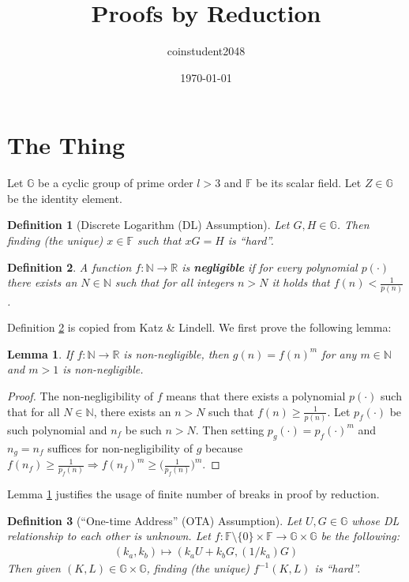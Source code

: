 \documentclass{article}
\title{Proofs by Reduction}
\author{coinstudent2048}
\date{\today}
\newtheorem{definition}{Definition}[section]
\newtheorem{lemma}[theorem]{Lemma}
\begin{document}
\maketitle


\section{The Thing}
\noindent Let $\mathbb{G}$ be a cyclic group of prime order $l>3$ and $\mathbb{F}$ be its scalar field. Let $Z\in\mathbb{G}$ be the identity element.

\begin{definition}[Discrete Logarithm (DL) Assumption]
Let $G, H\in\mathbb{G}$. Then finding (the unique) $x\in\mathbb{F}$ such that $xG=H$ is ``hard''.
\end{definition}

\begin{definition}\label{negl}
A function $f:\mathbb{N}\rightarrow\mathbb{R}$ is \textbf{\em negligible} if for every polynomial $p(\cdot)$ there exists an $N\in\mathbb{N}$ such that for all integers $n>N$ it holds that $f(n)<\frac{1}{p(n)}$.
\end{definition}

\noindent Definition \ref{negl} is copied from Katz \& Lindell. We first prove the following lemma:

\begin{lemma}\label{negl-exp}
If $f:\mathbb{N}\rightarrow\mathbb{R}$ is non-negligible, then $g(n)=f(n)^m$ for any $m\in\mathbb{N}$ and $m>1$ is non-negligible.
\end{lemma}
\begin{proof}
The non-negligibility of $f$ means that there exists a polynomial $p(\cdot)$ such that for all $N\in\mathbb{N}$, there exists an $n>N$ such that $f(n)\ge\frac{1}{p(n)}$. Let $p_f(\cdot)$ be such polynomial and $n_f$ be such $n>N$. Then setting $p_g(\cdot)=p_f(\cdot)^m$ and $n_g=n_f$ suffices for non-negligibility of $g$ because $f(n_f)\ge\frac{1}{p_f(n)}\Rightarrow f(n_f)^m\ge\big(\frac{1}{p_f(n)}\big)^m$.
\end{proof}

\noindent Lemma \ref{negl-exp} justifies the usage of finite number of breaks in proof by reduction.

\begin{definition}[``One-time Address'' (OTA) Assumption]
Let $U, G\in\mathbb{G}$ whose DL relationship to each other is unknown. Let $f:\mathbb{F}\setminus\{0\}\times\mathbb{F}\rightarrow\mathbb{G}\times\mathbb{G}$ be the following:
\begin{align*}
    (k_a, k_b) \mapsto (k_a U + k_b G, (1/k_a)G)
\end{align*}
Then given $(K, L)\in\mathbb{G}\times\mathbb{G}$, finding (the unique) $f^{-1}(K,L)$ is ``hard''.
\end{definition}
\end{document}
